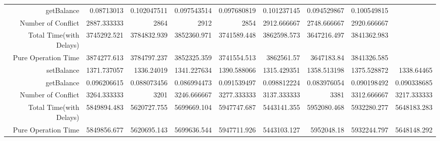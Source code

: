 \begin{landscape}
\begin{table}[htbp]
\begin{tabular}{rrrrrrrrr}
    getBalance & 0.08713013 & 0.102047511 & 0.097543514 & 0.097680819 & 0.101237145 & 0.094529867 & 0.100549815 &  \\
    Number of Conflict & 2887.333333 & 2864  & 2912  & 2854  & 2912.666667 & 2748.666667 & 2920.666667 &  \\
    Total Time(with Delays) & 3745292.521 & 3784832.939 & 3852360.971 & 3741589.448 & 3862598.573 & 3647216.497 & 3841362.983 &  \\
    Pure Operation Time & 3874277.613 & 3784797.237 & 3852325.359 & 3741554.513 & 3862561.57 & 3647183.84 & 3841326.585 &  \\
\cline{1-9}     
    setBalance & 1371.737057 & 1336.24019 & 1341.227634 & 1390.588066 & 1315.429351 & 1358.513198 & 1375.528872 & 1338.64465 \\
    getBalance & 0.096206615 & 0.088073456 & 0.086994473 & 0.091539497 & 0.098812224 & 0.083976054 & 0.090198492 & 0.090338685 \\
    Number of Conflict & 3264.333333 & 3201  & 3246.666667 & 3277.333333 & 3137.333333 & 3381  & 3312.666667 & 3217.333333 \\
    Total Time(with Delays) & 5849894.483 & 5620727.755 & 5699669.104 & 5947747.687 & 5443141.355 & 5952080.468 & 5932280.277 & 5648183.283 \\
    Pure Operation Time & 5849856.677 & 5620695.143 & 5699636.544 & 5947711.926 & 5443103.127 & 5952048.18 & 5932244.797 & 5648148.292 \\
    \bottomrule
    \end{tabular}%
  \label{tab:increment Cache}%
\end{table}%
\end{landscape}